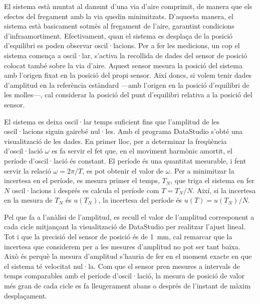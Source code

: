 \documentclass[12pt,a4paper]{article}
\begin{document}
El sistema està muntat al damunt d'una via d'aire comprimit, de manera que els efectes del fregament amb la via quedin minimitzats. D'aquesta manera, el sistema està basicament sotmès al fregament de l'aire, garantint condicions d'infraamortiment. Efectivament, quan el sistema es desplaça de la posició d'equilibri es poden observar oscil·lacions. Per a fer les medicions, un cop el sistema comença a oscil·lar, s'activa la recollida de dades del sensor de posició colocat també sobre la via d'aire. Aquest sensor mesura la posició del sistema amb l'origen fixat en la posició del propi sensor. Així doncs, si volem tenir dades d'amplitud en la referència estàndard ---amb l'origen en la posició d'equilibri de les molles---, cal considerar la posició del punt d'equilibri relativa a la posició del sensor.

El sistema es deixa oscil·lar temps suficient fins que l'amplitud de les oscil·lacions siguin gairebé nul·les. Amb el programa DataStudio s'obté una visualització de les dades. En primer lloc, per a determinar la freqüència d'oscil·lació \( \omega \) es fa servir el fet que, en el moviment harmònic amortit, el període d'oscil·lació és constant. El període és una quantitat mesurable, i fent servir la relació \( \omega = 2\pi/T \), es pot obtenir el valor de \( \omega \). Per a minimitzar la incertesa en el període, es mesura primer el temps, \( T_N \), que triga el sistema en fer \( N \) oscil·lacions i després es calcula el període com \( T = T_N / N \). Així, si la incertesa en la mesura de \( T_N \) és \( u(T_N) \), la incertesa del període és \( u(T) = u(T_N)/N \).

Pel que fa a l'anàlisi de l'amplitud, es recull el valor de l'amplitud corresponent a cada cicle mitjançant la visualització de DataStudio per realitzar l'ajust lineal. Tot i que la precisió del sensor de posició és de \SI{1}{mm}, cal remarcar que la incertesa que considerem per a les mesures d'amplitud no pot ser tant baixa. Això és perquè la mesura d'amplitud s'hauria de fer en el moment exacte en que el sistema té velocitat nul·la. Com que el sensor pren mesures a intervals de temps comparables amb el període d'oscil·lació, la mesura de posició de valor més gran de cada cicle es fa lleugerament abans o després de l'instant de màxim desplaçament.
\end{document}
